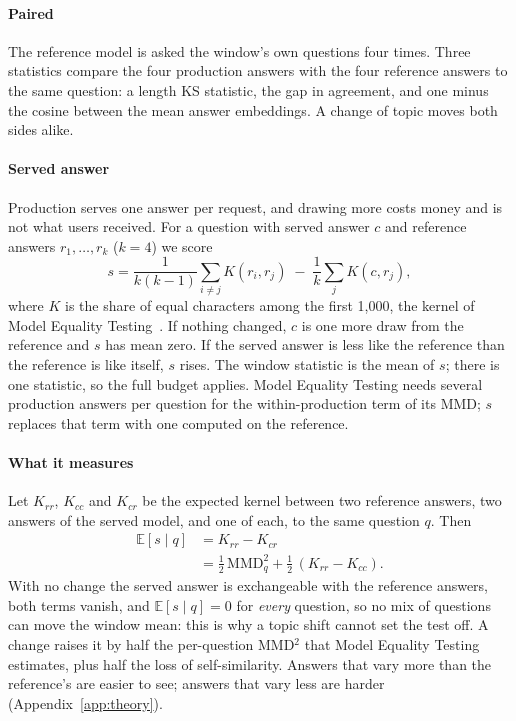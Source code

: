 \documentclass[11pt]{article}
\begin{document}
\paragraph{Paired} The reference model is asked the window's own questions four
times. Three statistics compare the four production answers with the four
reference answers to the same question: a length KS statistic, the gap in
agreement, and one minus the cosine between the mean answer embeddings. A change of
topic moves both sides alike.

\paragraph{Served answer}
\label{sec:served}
Production serves one answer per request, and drawing more costs money and is not
what users received. For a question with served answer $c$ and reference answers
$r_1,\dots,r_k$ ($k=4$) we score
\[
  s = \frac{1}{k(k-1)}\sum_{i\neq j} K(r_i,r_j) \;-\; \frac{1}{k}\sum_{j} K(c,r_j),
\]
where $K$ is the share of equal characters among the first 1{,}000, the kernel of
Model Equality Testing~\citep{gao2025model}. If nothing changed, $c$ is one more
draw from the reference and $s$ has mean zero. If the served answer is less like
the reference than the reference is like itself, $s$ rises. The window statistic is
the mean of $s$; there is one statistic, so the full budget applies. Model Equality
Testing needs several production answers per question for the within-production
term of its MMD; $s$ replaces that term with one computed on the reference.

\paragraph{What it measures} Let $K_{rr}$, $K_{cc}$ and $K_{cr}$ be the expected
kernel between two reference answers, two answers of the served model, and one of
each, to the same question $q$. Then
\begin{align*}
  \mathbb{E}[s\mid q] &= K_{rr}-K_{cr}\\
  &= \tfrac12\,\mathrm{MMD}^2_q + \tfrac12\,(K_{rr}-K_{cc}).
\end{align*}
With no change the served answer is exchangeable with the reference answers, both
terms vanish, and $\mathbb{E}[s\mid q]=0$ for \emph{every} question, so no mix of
questions can move the window mean: this is why a topic shift cannot set the test
off. A change raises it by half the per-question MMD$^2$ that Model Equality Testing
estimates, plus half the loss of self-similarity. Answers that vary more than the
reference's are easier to see; answers that vary less are harder
(Appendix~\ref{app:theory}).
\end{document}
